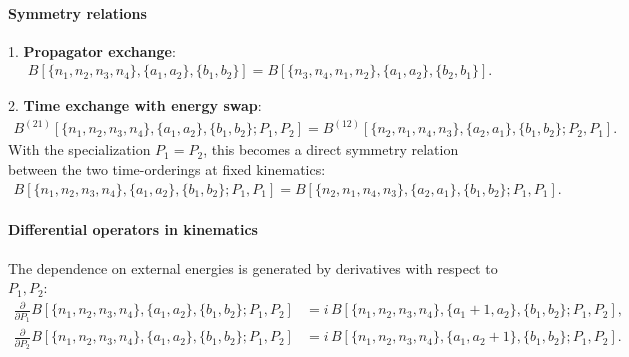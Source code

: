 \documentclass[a4paper,12pt]{article}
\begin{document}
\paragraph{Symmetry relations}
1. \textbf{Propagator exchange}:
\begin{align}
	B[\{n_1,n_2,n_3,n_4\},\{a_1,a_2\},\{b_1,b_2\}] = B[\{n_3,n_4,n_1,n_2\},\{a_1,a_2\},\{b_2,b_1\}].
\end{align}

2. \textbf{Time exchange with energy swap}:
\begin{align}
	B^{(21)}[\{n_1,n_2,n_3,n_4\},\{a_1,a_2\},\{b_1,b_2\}; P_1,P_2] = B^{(12)}[\{n_2,n_1,n_4,n_3\},\{a_2,a_1\},\{b_1,b_2\}; P_2,P_1].
\end{align}
With the specialization $P_1=P_2$, this becomes a direct symmetry relation between the two time-orderings at fixed kinematics:
\begin{align}
	B[\{n_1,n_2,n_3,n_4\},\{a_1,a_2\},\{b_1,b_2\}; P_1,P_1] = B[\{n_2,n_1,n_4,n_3\},\{a_2,a_1\},\{b_1,b_2\}; P_1,P_1].
\end{align}

\paragraph{Differential operators in kinematics}
The dependence on external energies is generated by derivatives with respect to $P_1,P_2$:
\begin{align}
	\frac{\partial}{\partial P_1}B[\{n_1,n_2,n_3,n_4\},\{a_1,a_2\},\{b_1,b_2\};P_1,P_2] &= i\,B[\{n_1,n_2,n_3,n_4\},\{a_1+1,a_2\},\{b_1,b_2\};P_1,P_2], \label{eq:GdP1}\\
	\frac{\partial}{\partial P_2}B[\{n_1,n_2,n_3,n_4\},\{a_1,a_2\},\{b_1,b_2\};P_1,P_2] &= i\,B[\{n_1,n_2,n_3,n_4\},\{a_1,a_2+1\},\{b_1,b_2\};P_1,P_2]. \label{eq:GdP2}
\end{align}
\end{document}
